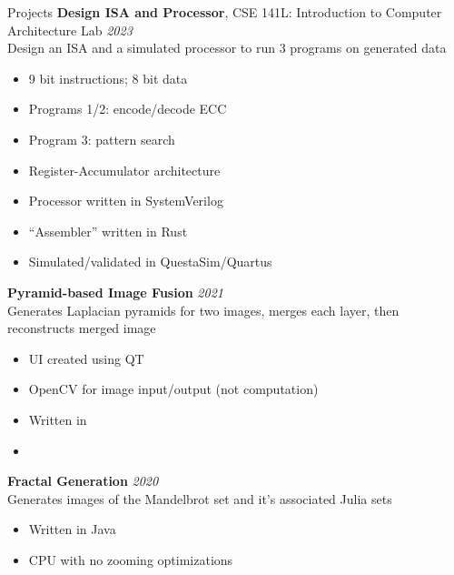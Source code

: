 \begin{rSection}{Projects}
		{\bf Design ISA and Processor}{, CSE 141L: Introduction to Computer Architecture Lab} \hfill {\em 2023} \\
		Design an ISA and a simulated processor to run 3 programs on generated data
		\begin{multicols}{2}
			\begin{itemize}
				\item 9 bit instructions; 8 bit data
				\item Programs 1/2: encode/decode ECC
				\item Program 3: pattern search
				\item Register-Accumulator architecture
				\item Processor written in SystemVerilog
				\item ``Assembler'' written in Rust
				\item Simulated/validated in QuestaSim/Quartus
			\end{itemize}
		\end{multicols}

		{\bf Pyramid-based Image Fusion}{} \hfill {\em 2021} \\
		Generates Laplacian pyramids for two images, merges each layer, then reconstructs merged image
		\begin{multicols}{2}
			\begin{itemize}
				\item UI created using QT
				\item OpenCV for image input/output (not computation)
				\item Written in \CC
				\item[\vspace{\fill}] %
			\end{itemize}
		\end{multicols}

		{\bf Fractal Generation}{} \hfill {\em 2020}\\
		Generates images of the Mandelbrot set and it's associated Julia sets
		\begin{multicols}{2}
			\begin{itemize}
				\item Written in Java
				\item CPU with no zooming optimizations
			\end{itemize}
		\end{multicols}


\end{rSection}
